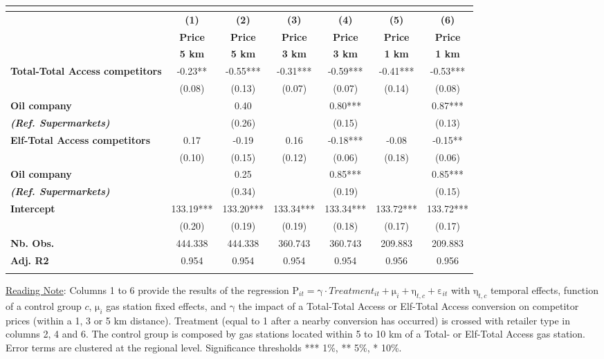 \documentclass[english]{article}
\begin{document}
\begin{center}
\begin{footnotesize} %
\begin{tabular}{l|cccccc}
\multicolumn{1}{l}{} &  &  &  &  &  & \tabularnewline
\hline
\hline
 & \textbf{(1)}  & \textbf{(2)}  & \textbf{(3)}  & \textbf{(4)}  & \textbf{(5)}  & \textbf{(6)}\tabularnewline
 & \textbf{Price}  & \textbf{Price}  & \textbf{Price}  & \textbf{Price}  & \textbf{Price}  & \textbf{Price}\tabularnewline
 & \textbf{5 km}  & \textbf{5 km}  & \textbf{3 km}  & \textbf{3 km}  & \textbf{1 km}  & \textbf{1 km}\tabularnewline
\hline
\textbf{Total-Total Access competitors}  & -0.23{*}{*}  & -0.55{*}{*}{*}  & -0.31{*}{*}{*}  & -0.59{*}{*}{*}  & -0.41{*}{*}{*}  & -0.53{*}{*}{*}\tabularnewline
 & (0.08)  & (0.13)  & (0.07)  & (0.07)  & (0.14)  & (0.08)\tabularnewline
\textbf{Oil company}  &  & 0.40  &  & 0.80{*}{*}{*}  &  & 0.87{*}{*}{*}\tabularnewline
\textbf{\textit{(Ref. Supermarkets)}}  &  & (0.26)  &  & (0.15)  &  & (0.13)\tabularnewline
\hline
\textbf{Elf-Total Access competitors}  & 0.17  & -0.19  & 0.16  & -0.18{*}{*}{*}  & -0.08  & -0.15{*}{*}\tabularnewline
 & (0.10)  & (0.15)  & (0.12)  & (0.06)  & (0.18)  & (0.06)\tabularnewline
\textbf{Oil company}  &  & 0.25  &  & 0.85{*}{*}{*}  &  & 0.85{*}{*}{*}\tabularnewline
\textbf{\textit{(Ref. Supermarkets)}}  &  & (0.34)  &  & (0.19)  &  & (0.15)\tabularnewline
\hline
\textbf{Intercept}  & 133.19{*}{*}{*}  & 133.20{*}{*}{*}  & 133.34{*}{*}{*}  & 133.34{*}{*}{*}  & 133.72{*}{*}{*}  & 133.72{*}{*}{*}\tabularnewline
 & (0.20)  & (0.19)  & (0.19)  & (0.18)  & (0.17)  & (0.17)\tabularnewline
\hline
\textbf{Nb. Obs.}  & 444.338  & 444.338  & 360.743  & 360.743  & 209.883  & 209.883\tabularnewline
\textbf{Adj. R2}  & 0.954  & 0.954  & 0.954  & 0.954  & 0.956  & 0.956\tabularnewline
\hline
\hline
\multicolumn{1}{l}{} &  &  &  &  &  & \tabularnewline
\end{tabular}\end{footnotesize}
\par\end{center}

{\small{}\uline{Reading Note}}{\small{}: } Columns 1 to 6 provide the results of the regression $\mathrm{P}_{it}=\mathrm{\gamma}\cdot Treatment_{it}+\mathrm{\mu}_{i}+\mathrm{\eta}_{t,c}+\mathrm{\varepsilon}_{it}$
with $\mathrm{\eta}_{t,c}$ temporal effects, function of a control group $c$, $\mathrm{\mu}_{i}$ gas station fixed effects, and $\mathrm{\gamma}$ the impact of a Total-Total Access or Elf-Total Access conversion on competitor prices (within a 1, 3 or 5 km distance). Treatment (equal to 1 after a nearby conversion has occurred) is crossed with retailer type in columns 2, 4 and 6. The control group is composed by gas stations located within 5 to 10 km of a Total- or Elf-Total Access gas station. Error terms are clustered at the regional level. Significance thresholds {*}{*}{*} 1\%, {*}{*} 5\%, {*} 10\%.\medskip{}
\end{document}
